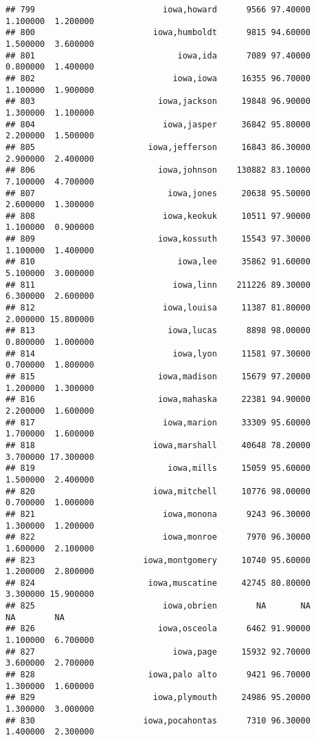 \documentclass[
]{article}
\begin{document}
\begin{verbatim}
## 799                          iowa,howard      9566 97.40000  1.100000  1.200000
## 800                        iowa,humboldt      9815 94.60000  1.500000  3.600000
## 801                             iowa,ida      7089 97.40000  0.800000  1.400000
## 802                            iowa,iowa     16355 96.70000  1.100000  1.900000
## 803                         iowa,jackson     19848 96.90000  1.300000  1.100000
## 804                          iowa,jasper     36842 95.80000  2.200000  1.500000
## 805                       iowa,jefferson     16843 86.30000  2.900000  2.400000
## 806                         iowa,johnson    130882 83.10000  7.100000  4.700000
## 807                           iowa,jones     20638 95.50000  2.600000  1.300000
## 808                          iowa,keokuk     10511 97.90000  1.100000  0.900000
## 809                         iowa,kossuth     15543 97.30000  1.100000  1.400000
## 810                             iowa,lee     35862 91.60000  5.100000  3.000000
## 811                            iowa,linn    211226 89.30000  6.300000  2.600000
## 812                          iowa,louisa     11387 81.80000  2.000000 15.800000
## 813                           iowa,lucas      8898 98.00000  0.800000  1.000000
## 814                            iowa,lyon     11581 97.30000  0.700000  1.800000
## 815                         iowa,madison     15679 97.20000  1.200000  1.300000
## 816                         iowa,mahaska     22381 94.90000  2.200000  1.600000
## 817                          iowa,marion     33309 95.60000  1.700000  1.600000
## 818                        iowa,marshall     40648 78.20000  3.700000 17.300000
## 819                           iowa,mills     15059 95.60000  1.500000  2.400000
## 820                        iowa,mitchell     10776 98.00000  0.700000  1.000000
## 821                          iowa,monona      9243 96.30000  1.300000  1.200000
## 822                          iowa,monroe      7970 96.30000  1.600000  2.100000
## 823                      iowa,montgomery     10740 95.60000  1.200000  2.800000
## 824                       iowa,muscatine     42745 80.80000  3.300000 15.900000
## 825                          iowa,obrien        NA       NA        NA        NA
## 826                         iowa,osceola      6462 91.90000  1.100000  6.700000
## 827                            iowa,page     15932 92.70000  3.600000  2.700000
## 828                       iowa,palo alto      9421 96.70000  1.300000  1.600000
## 829                        iowa,plymouth     24986 95.20000  1.300000  3.000000
## 830                      iowa,pocahontas      7310 96.30000  1.400000  2.300000

\end{verbatim}
\end{document}
